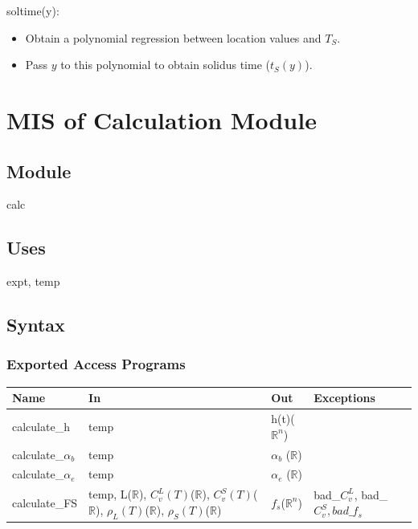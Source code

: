 \documentclass[12pt, titlepage]{article}
\begin{document}
\noindent soltime(y):
\begin{itemize}
\item Obtain a polynomial regression between location values and $T_S$.\\
\item Pass $y$ to this polynomial to obtain solidus time ($t_S(y)$).\\
\end{itemize}

\newpage

\section{MIS of Calculation Module} \label{calc}

\subsection{Module}

calc 

\subsection{Uses}

expt, temp

\subsection{Syntax}

\subsubsection{Exported Access Programs}

\begin{center}
\begin{tabular}{p{3cm} p{6cm} p{2cm} p{2cm}}
\hline
\textbf{Name} & \textbf{In} & \textbf{Out} & \textbf{Exceptions} \\
\hline
calculate\_h  &  temp & h(t)($\mathbb{R}^n$) & \\
calculate\_$\alpha_b$ & temp & $\alpha_b$ ($\mathbb{R}$) &\\
calculate\_$\alpha_e$ & temp & $\alpha_e$ ($\mathbb{R}$) &\\
calculate\_FS & temp, L($\mathbb{R}$), $C_v ^L (T)$($\mathbb{R}$), $C_v ^S
                (T)$($\mathbb{R}$), $\rho_L (T)$($\mathbb{R}$), $\rho_S
                (T)$($\mathbb{R}$) &  $f_s$($\mathbb{R}^n$)  & bad\_$C_v ^L$,
                                                               bad\_$C_v ^S,
                                                               bad\_f_s$\\

\hline
\end{tabular}
\end{center}
\end{document}
